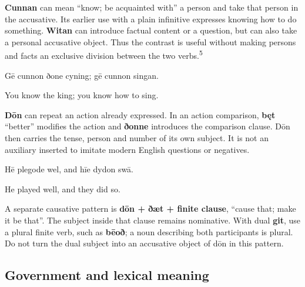 \textbf{Cunnan} can mean “know; be acquainted with” a person and take that person in the accusative. Its earlier use with a plain infinitive expresses knowing how to do something. \textbf{Witan} can introduce factual content or a question, but can also take a personal accusative object. Thus the contrast is useful without making persons and facts an exclusive division between the two verbs.\textsuperscript{5}

Gē cunnon ðone cyning; gē cunnon singan.

You know the king; you know how to sing.

\textbf{Dōn} can repeat an action already expressed. In an action comparison, \textbf{bęt} “better” modifies the action and \textbf{ðonne} introduces the comparison clause. Dōn then carries the tense, person and number of its own subject. It is not an auxiliary inserted to imitate modern English questions or negatives.

Hē plegode wel, and hīe dydon swā.

He played well, and they did so.

A separate causative pattern is \textbf{dōn + ðæt + finite clause}, “cause that; make it be that”. The subject inside that clause remains nominative. With dual \textbf{git}, use a plural finite verb, such as \textbf{bēoð}; a noun describing both participants is plural. Do not turn the dual subject into an accusative object of dōn in this pattern.

\subsection*{Government and lexical meaning}

